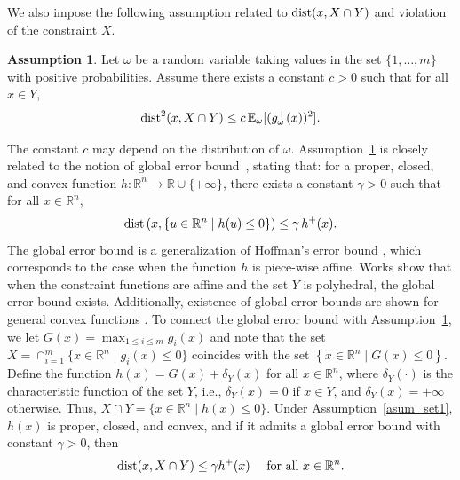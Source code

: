 \documentclass{article}
\def\R{\mathbb{R}}
\def\dist{{\rm dist}}
\newcommand{\Ex}{\mathbb{E}}
\theoremstyle{plain}
\theoremstyle{definition}
\newtheorem{assumption}[theorem]{Assumption}
\theoremstyle{remark}
\begin{document}
We also impose the following assumption related to $\dist(x,X\cap Y)$ and violation of the constraint $X$.
\begin{assumption}\label{asum_err_bd}
Let $\omega$ be a random variable taking values in the set $\{1,\ldots,m\}$ with positive probabilities. Assume there exists a constant $c > 0$ such that for all $x \in Y$,
    \begin{align}
        \dist^2(x, X \cap Y) \leq c \, \Ex_{\omega}[(g_{\omega}^+(x))^2] . \nonumber
    \end{align}
\end{assumption}
%
%
The constant $c$ may depend on the distribution of $\omega$. Assumption~\ref{asum_err_bd} is closely related to the notion of global error bound~\cite{lewis1998error}, stating that: for a proper, closed, and convex function $h:\mathbb{R}^n \rightarrow \mathbb{R}\cup\{+\infty\}$, there exists a constant $\gamma > 0$ such that for all $x \in \mathbb{R}^n$,
\begin{align}
    \dist \left(x, \{u \in \mathbb{R}^n \mid h(u) \le 0\}\right)
    \le \gamma\, h^+(x). \nonumber
\end{align}
The global error bound is a generalization of Hoffman's error bound \cite{Hoffman1952, hoffman2003approximate}, which corresponds to the case when the function $h$ is piece-wise affine. Works \cite{hoffman2003approximate, li2013global} show that when the constraint functions are affine and the set $Y$ is polyhedral, the global error bound exists. Additionally, existence of global error bounds are shown for general convex functions \cite{li2013global, luo1994extension, lewis1998error, hu1989approximate}. To connect the global error bound with Assumption~\ref{asum_err_bd}, we let $G(x) = \max_{1 \le i \le m} g_i(x)$ and
note that the set $X=\cap_{i=1}^m \{ x\in\R^n \mid g_i(x) \leq 0 \}$ coincides with the set $\left\{ x\in\R^n \mid G(x) \leq 0 \right\}$. Define the function $h(x) = G(x) + \delta_Y(x)$ for all $x \in \R^n$,
where $\delta_Y(\cdot)$ is the characteristic function of the set $Y$, i.e., $\delta_Y(x) = 0$ if $x \in Y$, and $\delta_Y(x) = +\infty$ otherwise. Thus, $X\cap Y=\{x\in\R^n\mid h(x)\le 0\}$.
Under Assumption~\ref{asum_set1}, $h(x)$ is proper, closed, and convex, and if it admits a global error bound with constant $\gamma > 0$, then
\begin{align}
    \dist(x, X \cap Y) \leq \gamma h^+(x) \quad \text{ for all $x \in \R^n$}. 
    \label{global_err_bd}
\end{align}
\end{document}
